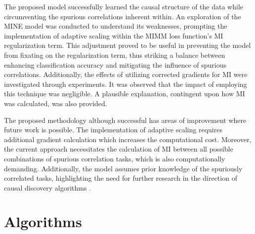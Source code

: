 \documentclass[12pt,DIV14,BCOR12mm,a4paper,footinclude=false,headinclude,parskip=half-,twoside,openright,cleardoublepage=empty,toc=index,bibliography=totoc,listof=totoc]{scrreprt}
\numberwithin{equation}{chapter}
\begin{document}
The proposed model successfully learned the causal structure of the data while circumventing the spurious correlations inherent within. An exploration of the MINE model was conducted to understand its weaknesses, prompting the implementation of adaptive scaling within the MIMM loss function's MI regularization term. This adjustment proved to be useful in preventing the model from fixating on the regularization term, thus striking a balance between enhancing classification accuracy and mitigating the influence of spurious correlations. Additionally, the effects of utilizing corrected gradients for MI were investigated through experiments. It was observed that the impact of employing this technique was negligible. A plausible explanation, contingent upon how MI was calculated, was also provided.

The proposed methodology although successful has areas of improvement where future work is possible. The implementation of adaptive scaling requires additional gradient calculation which increases the computational cost. Moreover, the current approach necessitates the calculation of MI between all possible combinations of spurious correlation tasks, which is also computationally demanding. Additionally, the model assumes prior knowledge of the spuriously correlated tasks, highlighting the need for further research in the direction of causal discovery algorithms \cite{10162210}.






 
\appendix
\chapter{Algorithms}
\end{document}
